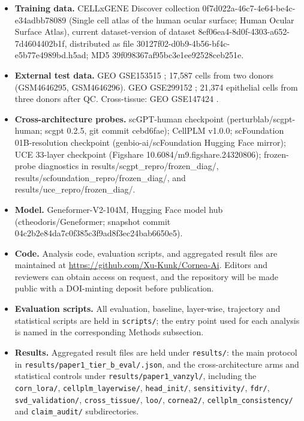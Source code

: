 \documentclass[12pt,letterpaper]{article}
\begin{document}
\begin{itemize}
\item \textbf{Training data.} CELLxGENE Discover collection 0f7d022a-46c7-4e64-be4c-e34adbb78089 (Single cell atlas of the human ocular surface; Human Ocular Surface Atlas), current dataset-version of dataset 8ef06ea4-8d0f-4303-a652-7d4604402b1f, distributed as file 30127f02-d0b9-4b56-bf4c-e5b77e4989bd.h5ad; MD5 39f098367af95bc3e1ee92528ceb251e.
\item \textbf{External test data.} GEO GSE153515 \cite{li2021oculsurf}; 17{,}587 cells from two donors (GSM4646295, GSM4646296). GEO GSE299152 \cite{gse299152}; 21{,}374 epithelial cells from three donors after QC. Cross-tissue: GEO GSE147424 \cite{he2020epidermis}.
\item \textbf{Cross-architecture probes.} scGPT-human checkpoint (perturblab/scgpt-human; scgpt 0.2.5, git commit cebd6fae); CellPLM v1.0.0; scFoundation 01B-resolution checkpoint (genbio-ai/scFoundation Hugging Face mirror); UCE 33-layer checkpoint (Figshare 10.6084/m9.figshare.24320806); frozen-probe diagnostics in results/scgpt\_repro/frozen\_diag/, results/scfoundation\_repro/frozen\_diag/, and results/uce\_repro/frozen\_diag/.
\item \textbf{Model.} Geneformer-V2-104M, Hugging Face model hub (ctheodoris/Geneformer; snapshot commit 04c2b2e84da7c0f385c3f9ad8f3ec24bab6650e5).
\item \textbf{Code.} Analysis code, evaluation scripts, and aggregated result files are maintained at \url{https://github.com/Xu-Kunk/Cornea-Ai}. Editors and reviewers can obtain access on request, and the repository will be made public with a DOI-minting deposit before publication.
\item \textbf{Evaluation scripts.} All evaluation, baseline, layer-wise, trajectory and statistical scripts are held in \texttt{scripts/\allowbreak}; the entry point used for each analysis is named in the corresponding Methods subsection.
\item \textbf{Results.} Aggregated result files are held under \texttt{results/\allowbreak}: the main protocol in \texttt{results/\allowbreak paper1\_\allowbreak tier\_\allowbreak b\_\allowbreak eval/\allowbreak *.json}, and the cross-architecture arms and statistical controls under \texttt{results/\allowbreak paper1\_\allowbreak vanzyl/\allowbreak}, including the \texttt{corn\_\allowbreak lora/\allowbreak}, \texttt{cellplm\_\allowbreak layerwise/\allowbreak}, \texttt{head\_\allowbreak init/\allowbreak}, \texttt{sensitivity/\allowbreak}, \texttt{fdr/\allowbreak}, \texttt{svd\_\allowbreak validation/\allowbreak}, \texttt{cross\_\allowbreak tissue/\allowbreak}, \texttt{loo/\allowbreak}, \texttt{cornea2/\allowbreak}, \texttt{cellplm\_\allowbreak consistency/\allowbreak} and \texttt{claim\_\allowbreak audit/\allowbreak} subdirectories.

\end{itemize}
\end{document}

